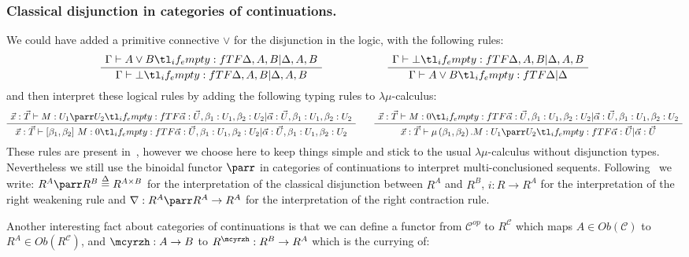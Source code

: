 \documentclass{CSML}
\newcommand*\ifpresent[3]{\tl_if_empty:fTF{#1}{#3}{#2}}
\newcommand*\AXM[1]{\AxiomC{$#1$}}
\newcommand*\UIM[1]{\UnaryInfC{$#1$}}
\newcommand*\DP\DisplayProof
\newcommand*\Def{\mathrel{\overset{\Delta}{=}}}
\newcommand*\Entails{\mathrel{\vdash}}
\newcommand*\BarSep{\mathrel{|}}
\newcommand*\Sequent[3]{#1\Entails#2\ifpresent{#3}{\BarSep}{}#3}
\newcommand*\LogBot\bot
\newcommand*\LogFormA{A}
\newcommand*\LogFormB{B}
\newcommand*\LmSortBot0
\newcommand*\LmSortA{T}
\newcommand*\LmSortB{U}
\newcommand*\LmTerm[2]{#1\mathrel{:}#2}
\newcommand*\LmTermA{M}
\newcommand*\LmVarA{x}
\newcommand*\LmMVarA\alpha
\newcommand*\LmMVarB\beta
\newcommand*\CatC{\mathcal{C}}
\newcommand*\CatObj[1]{Ob\left(#1\right)}
\newcommand*\CatObjA{A}
\newcommand*\CatObjB{B}
\newcommand*\CatR{R}
\newcommand*\CatRC{\CatExp{\CatR}{\CatC}}
\newcommand*\CatTimes\times
\newcommand*\CatExp[2]{#1^{#2}}
\newcommand*\CatPar\parr
\newcommand*\CatCHomA\mcyrzh
\begin{document}
\subsubsection{Classical disjunction in categories of continuations.} We could have added a primitive connective $\vee$ for the disjunction in the logic, with the following rules:
$$\AXM{\Sequent{\Gamma}{\LogFormA\vee\LogFormB}{\Delta,\LogFormA,\LogFormB}}\UIM{\Sequent{\Gamma}{\LogBot}{\Delta,\LogFormA,\LogFormB}}\DP\qquad\qquad\qquad\AXM{\Sequent{\Gamma}{\LogBot}{\Delta,\LogFormA,\LogFormB}}\UIM{\Sequent{\Gamma}{\LogFormA\vee\LogFormB}{\Delta}}\DP$$
and then interpret these logical rules by adding the following typing rules to $\lambda\mu$-calculus:
$$\AXM{\Sequent{\LmTerm{\vec{\LmVarA}}{\vec{\LmSortA}}}{\LmTerm{\LmTermA}{\LmSortB_1\parr\LmSortB_2}}{\LmTerm{\vec{\LmMVarA}}{\vec{\LmSortB}},\LmTerm{\LmMVarB_1}{\LmSortB_1},\LmTerm{\LmMVarB_2}{\LmSortB_2}}}\UIM{\Sequent{\LmTerm{\vec{\LmVarA}}{\vec{\LmSortA}}}{\LmTerm{\left[\LmMVarB_1,\LmMVarB_2\right]\,\LmTermA}{\LmSortBot}}{\LmTerm{\vec{\LmMVarA}}{\vec{\LmSortB}},\LmTerm{\LmMVarB_1}{\LmSortB_1},\LmTerm{\LmMVarB_2}{\LmSortB_2}}}\DP\qquad\AXM{\Sequent{\LmTerm{\vec{\LmVarA}}{\vec{\LmSortA}}}{\LmTerm{\LmTermA}{\LmSortBot}}{\LmTerm{\vec{\LmMVarA}}{\vec{\LmSortB}},\LmTerm{\LmMVarB_1}{\LmSortB_1},\LmTerm{\LmMVarB_2}{\LmSortB_2}}}\UIM{\Sequent{\LmTerm{\vec{\LmVarA}}{\vec{\LmSortA}}}{\LmTerm{\mu\left(\LmMVarB_1,\LmMVarB_2\right).\LmTermA}{\LmSortB_1\parr\LmSortB_2}}{\LmTerm{\vec{\LmMVarA}}{\vec{\LmSortB}}}}\DP$$
These rules are present in~\cite{SelingerControl}, however we choose here to keep things simple and stick to the usual $\lambda\mu$-calculus without disjunction types. Nevertheless we still use the binoidal functor $\CatPar$ in categories of continuations to interpret multi-conclusioned sequents. Following~\cite{SelingerControl} we write: $\CatExp{\CatR}{\CatObjA}\CatPar\CatExp{\CatR}{\CatObjB}\Def\CatExp{\CatR}{\CatObjA\CatTimes\CatObjB}$ for the interpretation of the classical disjunction between $\CatExp{\CatR}{\CatObjA}$ and $\CatExp{\CatR}{\CatObjB}$, $i:\CatR\to\CatExp{\CatR}{\CatObjA}$ for the interpretation of the right weakening rule and $\nabla:\CatExp{\CatR}{\CatObjA}\CatPar\CatExp{\CatR}{\CatObjA}\to\CatExp{\CatR}{\CatObjA}$ for the interpretation of the right contraction rule.\par
Another interesting fact about categories of continuations is that we can define a functor from $\CatC^{op}$ to $\CatRC$ which maps $\CatObjA\in\CatObj{\CatC}$ to $\CatExp{\CatR}{\CatObjA}\in\CatObj{\CatRC}$, and $\CatCHomA:\CatObjA\to\CatObjB$ to $\CatExp{\CatR}{\CatCHomA}:\CatExp{\CatR}{\CatObjB}\to\CatExp{\CatR}{\CatObjA}$ which is the currying of:
\end{document}
